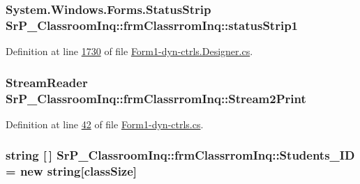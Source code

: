 \hypertarget{class_sr_p___classroom_inq_1_1frm_classrrom_inq_a3d73a45e941d1d5e3ac5a00180dde14a}{
\subsubsection[{status\-Strip1}]{\setlength{\rightskip}{0pt plus 5cm}\-System.\-Windows.\-Forms.\-Status\-Strip {\bf \-Sr\-P\-\_\-\-Classroom\-Inq\-::frm\-Classrrom\-Inq\-::status\-Strip1}}}
\label{class_sr_p___classroom_inq_1_1frm_classrrom_inq_a3d73a45e941d1d5e3ac5a00180dde14a}


\-Definition at line \hyperlink{_form1-dyn-ctrls_8_designer_8cs_source_l01730}{1730} of file \hyperlink{_form1-dyn-ctrls_8_designer_8cs_source}{\-Form1-\/dyn-\/ctrls.\-Designer.\-cs}.

\hypertarget{class_sr_p___classroom_inq_1_1frm_classrrom_inq_aa030f46a7915eae3a0b8b88661be51a8}{
\subsubsection[{\-Stream2\-Print}]{\setlength{\rightskip}{0pt plus 5cm}\-Stream\-Reader {\bf \-Sr\-P\-\_\-\-Classroom\-Inq\-::frm\-Classrrom\-Inq\-::\-Stream2\-Print}}}
\label{class_sr_p___classroom_inq_1_1frm_classrrom_inq_aa030f46a7915eae3a0b8b88661be51a8}


\-Definition at line \hyperlink{_form1-dyn-ctrls_8cs_source_l00042}{42} of file \hyperlink{_form1-dyn-ctrls_8cs_source}{\-Form1-\/dyn-\/ctrls.\-cs}.

\hypertarget{class_sr_p___classroom_inq_1_1frm_classrrom_inq_a68a93f6247168ebfa500f7afe83cce94}{
\subsubsection[{\-Students\-\_\-\-I\-D}]{\setlength{\rightskip}{0pt plus 5cm}string \mbox{[}$\,$\mbox{]} {\bf \-Sr\-P\-\_\-\-Classroom\-Inq\-::frm\-Classrrom\-Inq\-::\-Students\-\_\-\-I\-D} = new string\mbox{[}{\bf class\-Size}\mbox{]}}}
\label{class_sr_p___classroom_inq_1_1frm_classrrom_inq_a68a93f6247168ebfa500f7afe83cce94}


